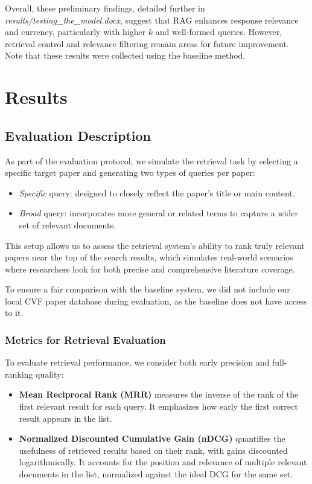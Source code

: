 \documentclass[fleqn,moreauthors,10pt]{ds_report}
\begin{document}
Overall, these preliminary findings, detailed further in \textit{results/testing\_the\_model.docx},
 suggest that RAG enhances response relevance and currency, particularly with higher $k$
  and well-formed queries. However, retrieval control and relevance filtering remain
  areas for future improvement. Note that these results were collected using the baseline method. 
  
\section*{Results}

\subsection*{Evaluation Description}

As part of the evaluation protocol, we simulate the retrieval task by selecting a specific target paper
and generating two types of queries per paper:

\begin{itemize}
    \item \textit{Specific} query: designed to closely reflect the paper’s title or main content.
    \item \textit{Broad} query: incorporates more general or related terms to capture a wider set of relevant documents.
\end{itemize}

This setup allows us to assess the retrieval system’s ability to rank truly relevant papers near the top of the search results,
which simulates real-world scenarios where researchers look for both precise and comprehensive literature coverage.

To ensure a fair comparison with the baseline system, we did not include our local CVF paper database during evaluation,
as the baseline does not have access to it.

\subsubsection*{Metrics for Retrieval Evaluation}

To evaluate retrieval performance, we consider both early precision and full-ranking quality:

\begin{itemize}
    \item \textbf{Mean Reciprocal Rank (MRR)} measures the inverse of the rank of the first relevant result for each query. 
    It emphasizes how early the first correct result appears in the list.
    
    \item \textbf{Normalized Discounted Cumulative Gain (nDCG)} quantifies the usefulness of retrieved results based on their rank, 
    with gains discounted logarithmically. It accounts for the position and relevance of multiple relevant documents in the list, 
    normalized against the ideal DCG for the same set.
\end{itemize}
\end{document}
